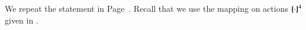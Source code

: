 
%

We repeat the statement in Page~\pageref{prop:op_corr_pHOp_to_HOp}. 
Recall that we use the mapping on actions $\{\!\!\{\cdot\}\!\!\}^{4}$ given in .

\begin{proposition}\myrm
	\label{app:prop:op_corr_pHOp_to_HOp}

\end{proposition}

